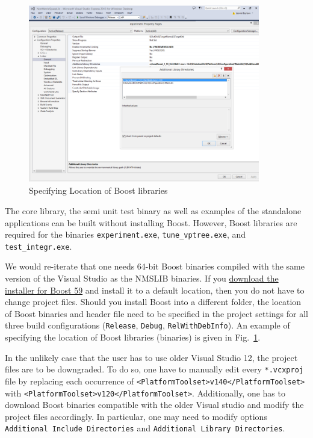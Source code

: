 \documentclass[runningheads,a4paper]{llncs}
\newcommand{\ttt}[1]{\texttt{#1}}
\begin{document}
{\begin{figure}
\centering
\caption{\label{FigBoostSet}Specifying Location of Boost libraries}
\includegraphics[width=0.9\textwidth]{figures/SettingBoostLocation.pdf}
\end{figure}

The core library, the semi unit test binary as well as examples of the standalone applications
can be built without installing Boost. 
However, Boost libraries are required for the binaries \ttt{experiment.exe}, \ttt{tune\_vptree.exe}, and \ttt{test\_integr.exe}.

We would re-iterate that one needs 64-bit Boost binaries compiled with the same version of the Visual Studio as the NMSLIB binaries.  
If you \href{http://sourceforge.net/projects/boost/files/boost-binaries/1.59.0/boost_1_59_0-msvc-14.0-64.exe/download}{download the installer for Boost 59} and install it to a default location, then you do not have to change project files.
Should you install Boost into a different folder, 
the location of Boost binaries and header file need to be specified in the 
project settings for all three build configurations (\ttt{Release}, \ttt{Debug}, \ttt{RelWithDebInfo}). An example of specifying the location of Boost libraries (binaries) is given in Fig.~\ref{FigBoostSet}.

In the unlikely case that the user has to use older Visual Studio 12, the project files are to be downgraded.
To do so, one have to manually edit every \ttt{*.vcxproj} file by replacing 
each occurrence of \ttt{<PlatformToolset>v140</PlatformToolset>} with \ttt{<PlatformToolset>v120</PlatformToolset>}.
Additionally, one has to download Boost binaries compatible with the older Visual studio and modify the project files
accordingly.
In particular, one may need to modify options \ttt{Additional Include Directories} and \ttt{Additional Library Directories}.

}
\end{document}
